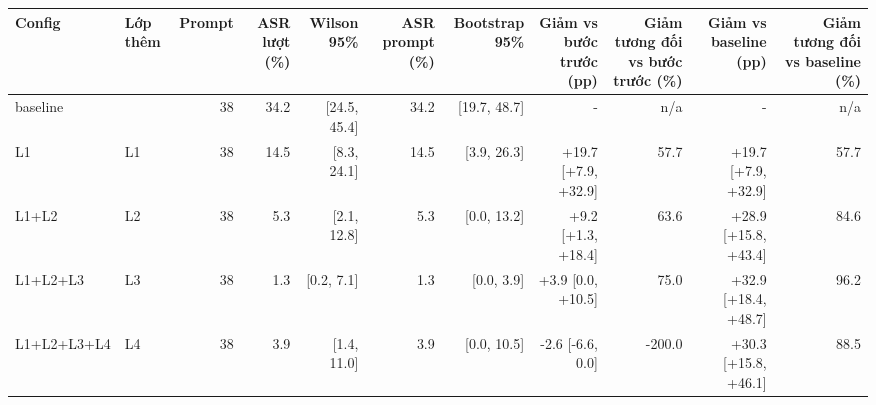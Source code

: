 \begin{tabular}{llrrrrrrrrr}
\toprule
Config & Lớp thêm & Prompt & ASR lượt (\%) & Wilson 95\% & ASR prompt (\%) & Bootstrap 95\% & Giảm vs bước trước (pp) & Giảm tương đối vs bước trước (\%) & Giảm vs baseline (pp) & Giảm tương đối vs baseline (\%) \\
\midrule
baseline &  & 38 & 34.2 & [24.5, 45.4] & 34.2 & [19.7, 48.7] & - & n/a & - & n/a \\
L1 & L1 & 38 & 14.5 & [8.3, 24.1] & 14.5 & [3.9, 26.3] & +19.7 [+7.9, +32.9] & 57.7 & +19.7 [+7.9, +32.9] & 57.7 \\
L1+L2 & L2 & 38 & 5.3 & [2.1, 12.8] & 5.3 & [0.0, 13.2] & +9.2 [+1.3, +18.4] & 63.6 & +28.9 [+15.8, +43.4] & 84.6 \\
L1+L2+L3 & L3 & 38 & 1.3 & [0.2, 7.1] & 1.3 & [0.0, 3.9] & +3.9 [0.0, +10.5] & 75.0 & +32.9 [+18.4, +48.7] & 96.2 \\
L1+L2+L3+L4 & L4 & 38 & 3.9 & [1.4, 11.0] & 3.9 & [0.0, 10.5] & -2.6 [-6.6, 0.0] & -200.0 & +30.3 [+15.8, +46.1] & 88.5 \\
\bottomrule
\end{tabular}
